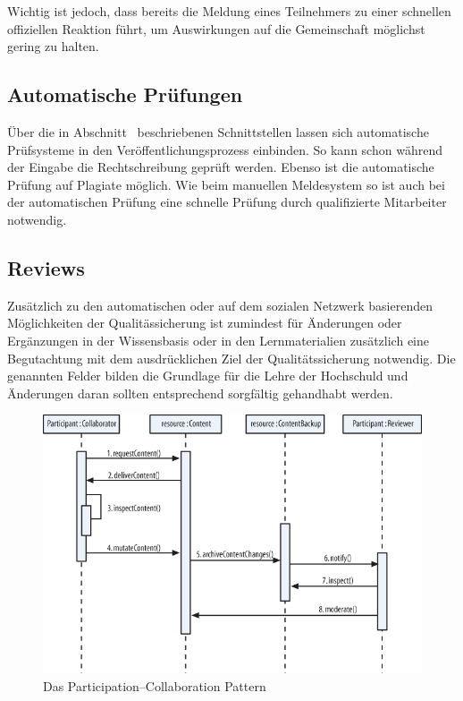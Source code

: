 Wichtig ist jedoch, dass bereits die Meldung eines Teilnehmers zu einer schnellen offiziellen Reaktion führt, um Auswirkungen auf die Gemeinschaft möglichst gering zu halten.

\subsection{Automatische Prüfungen} %
\label{sub:prufung_auf_plagiate}
Über die in Abschnitt~ beschriebenen Schnittstellen lassen sich automatische Prüfsysteme in den Veröffentlichungsprozess einbinden. So kann schon während der Eingabe die Rechtschreibung geprüft werden. Ebenso ist die automatische Prüfung auf Plagiate möglich. Wie beim manuellen Meldesystem so ist auch bei der automatischen Prüfung eine schnelle Prüfung durch qualifizierte Mitarbeiter notwendig.

\subsection{Reviews} %
Zusätzlich zu den automatischen oder auf dem sozialen Netzwerk basierenden Möglichkeiten der Qualitässicherung ist zumindest für Änderungen oder Ergänzungen in der Wissensbasis oder in den Lernmaterialien zusätzlich eine Begutachtung mit dem ausdrücklichen Ziel der Qualitätssicherung notwendig. Die genannten Felder bilden die Grundlage für die Lehre der Hochschuld und Änderungen daran sollten entsprechend sorgfältig gehandhabt werden.

\label{sub:reviews}
\begin{figure}[H]
\begin{center}
\includegraphics[width=\textwidth]{partcollpat.png}
\caption[Das Participation–Collaboration Pattern]{Das Participation–Collaboration Pattern\footnotemark}
\label{fig:partcolpat}
\end{center}
\end{figure}

